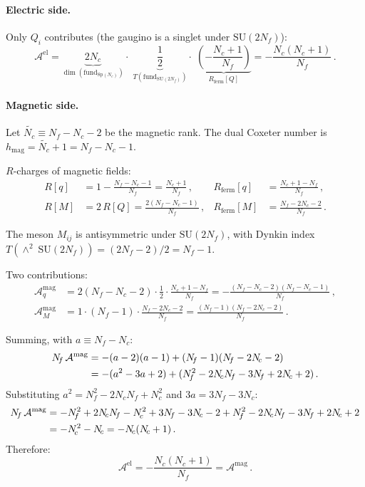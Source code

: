\documentclass[11pt,a4paper]{article}
\theoremstyle{plain}
\theoremstyle{definition}
\theoremstyle{remark}
\newcommand{\Nc}{N_{\!c}}
\newcommand{\Nf}{N_{\!f}}
\newcommand{\SU}[1]{\mathrm{SU}(#1)}
\newcommand{\Sp}[1]{\mathrm{Sp}(#1)}
\newcommand{\antisym}{\wedge^{\!2}}
\begin{document}
\paragraph{Electric side.}
Only $Q_i$ contributes (the gaugino is a singlet under $\SU{2\Nf}$):
\begin{equation}\label{eq:Sp-A-el}
  \mathcal{A}^{\mathrm{el}}
  = \underbrace{2\Nc}_{\dim(\mathrm{fund}_{\Sp{\Nc}})}
    \cdot\; \underbrace{\frac{1}{2}}_{T(\mathrm{fund}_{\SU{2\Nf}})}
    \cdot\; \underbrace{\left(-\frac{\Nc + 1}{\Nf}\right)}_{R_{\mathrm{ferm}}[Q]}
  = -\frac{\Nc(\Nc + 1)}{\Nf}\,.
\end{equation}

\paragraph{Magnetic side.}
Let $\widetilde{\Nc} \equiv \Nf - \Nc - 2$ be the magnetic rank.  The
dual Coxeter number is $h_{\mathrm{mag}} = \widetilde{\Nc} + 1 =
\Nf - \Nc - 1$.

$R$-charges of magnetic fields:
\begin{align}
  R[q] &= 1 - \frac{\Nf - \Nc - 1}{\Nf}
       = \frac{\Nc + 1}{\Nf}\,,
  &R_{\mathrm{ferm}}[q]
  &= \frac{\Nc + 1 - \Nf}{\Nf}\,,
  \label{eq:Rq} \\
  R[M] &= 2\,R[Q] = \frac{2(\Nf - \Nc - 1)}{\Nf}\,,
  &R_{\mathrm{ferm}}[M]
  &= \frac{\Nf - 2\Nc - 2}{\Nf}\,.
  \label{eq:RM}
\end{align}

The meson $M_{ij}$ is antisymmetric under $\SU{2\Nf}$, with
Dynkin index $T(\antisym\; \SU{2\Nf}) = (2\Nf - 2)/2 = \Nf - 1$.

Two contributions:
\begin{align}
  \mathcal{A}^{\mathrm{mag}}_q
  &= 2(\Nf - \Nc - 2) \cdot \frac{1}{2}
    \cdot \frac{\Nc + 1 - \Nf}{\Nf}
  = -\frac{(\Nf - \Nc - 2)(\Nf - \Nc - 1)}{\Nf}\,,
  \label{eq:Amag-q} \\[6pt]
  \mathcal{A}^{\mathrm{mag}}_M
  &= 1 \cdot (\Nf - 1) \cdot \frac{\Nf - 2\Nc - 2}{\Nf}
  = \frac{(\Nf - 1)(\Nf - 2\Nc - 2)}{\Nf}\,.
  \label{eq:Amag-M}
\end{align}

Summing, with $a \equiv \Nf - \Nc$:
\begin{align}
  \Nf\,\mathcal{A}^{\mathrm{mag}}
  &= -(a - 2)(a - 1) + (\Nf - 1)(\Nf - 2\Nc - 2) \notag \\
  &= -(a^2 - 3a + 2) + (\Nf^2 - 2\Nc\Nf - 3\Nf + 2\Nc + 2)\,.
  \label{eq:mag-expand}
\end{align}
Substituting $a^2 = \Nf^2 - 2\Nc\Nf + \Nc^2$ and $3a = 3\Nf - 3\Nc$:
\begin{align}
  \Nf\,\mathcal{A}^{\mathrm{mag}}
  &= -\Nf^2 + 2\Nc\Nf - \Nc^2 + 3\Nf - 3\Nc - 2
     + \Nf^2 - 2\Nc\Nf - 3\Nf + 2\Nc + 2 \notag \\
  &= -\Nc^2 - \Nc = -\Nc(\Nc + 1)\,.
  \label{eq:mag-result}
\end{align}
Therefore:
\begin{equation}\label{eq:anomaly-match}
  \boxed{
  \mathcal{A}^{\mathrm{el}}
  = -\frac{\Nc(\Nc + 1)}{\Nf}
  = \mathcal{A}^{\mathrm{mag}}
  }\,.
\end{equation}
\end{document}
